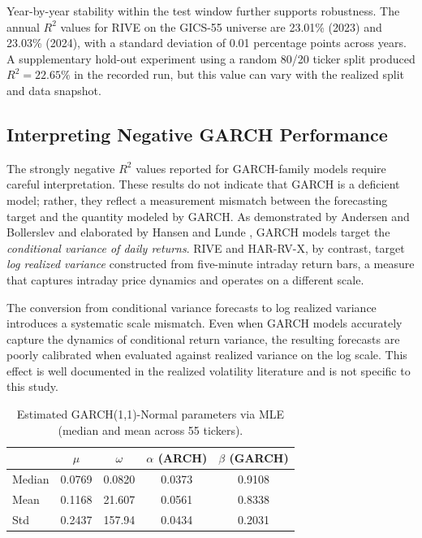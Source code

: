 \documentclass[review]{elsarticle}
\begin{document}
Year-by-year stability within the test window further supports robustness. The annual $R^2$ values for RIVE on the GICS-55 universe are 23.01\% (2023) and 23.03\% (2024), with a standard deviation of 0.01 percentage points across years. %
A supplementary hold-out experiment using a random 80/20 ticker split produced $R^2 = 22.65\%$ in the recorded run, but this value can vary with the realized split and data snapshot. %

\subsection{Interpreting Negative GARCH Performance}\label{sec:garch-fails}

The strongly negative $R^2$ values reported for GARCH-family models require careful interpretation. These results do not indicate that GARCH is a deficient model; rather, they reflect a measurement mismatch between the forecasting target and the quantity modeled by GARCH. As demonstrated by Andersen and Bollerslev \cite{andersen1998} and elaborated by Hansen and Lunde \cite{hansen2005}, GARCH models target the \textit{conditional variance of daily returns}. RIVE and HAR-RV-X, by contrast, target \textit{log realized variance} constructed from five-minute intraday return bars, a measure that captures intraday price dynamics and operates on a different scale.

The conversion from conditional variance forecasts to log realized variance introduces a systematic scale mismatch. Even when GARCH models accurately capture the dynamics of conditional return variance, the resulting forecasts are poorly calibrated when evaluated against realized variance on the log scale. This effect is well documented in the realized volatility literature and is not specific to this study.

\begin{table}[H]
\centering
\caption{Estimated GARCH(1,1)-Normal parameters via MLE (median and mean across 55 tickers).}
\label{tab:garch-params}
\begin{tabular}{lcccc}
\toprule
 & $\mu$ & $\omega$ & $\alpha$ (ARCH) & $\beta$ (GARCH) \\
\midrule
Median & 0.0769 & 0.0820 & 0.0373 & 0.9108 \\
Mean   & 0.1168 & 21.607 & 0.0561 & 0.8338 \\
Std    & 0.2437 & 157.94 & 0.0434 & 0.2031 \\
\bottomrule
\end{tabular}
\end{table}
\end{document}
